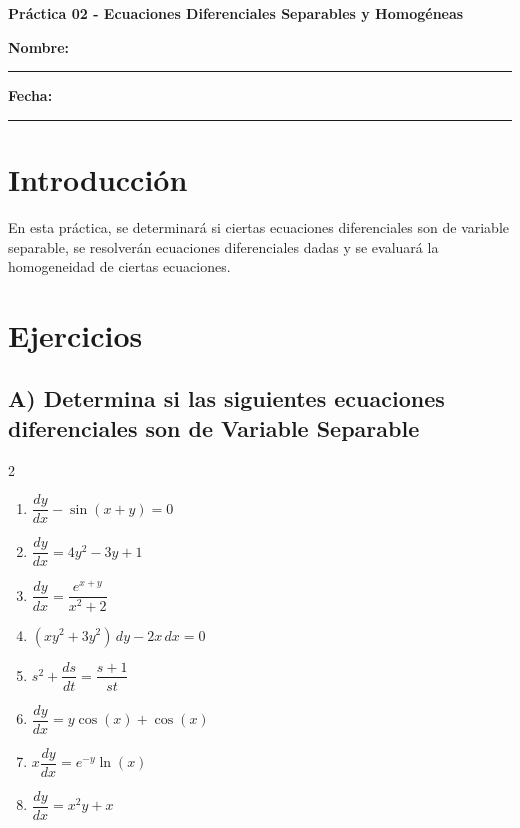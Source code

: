 \documentclass[a4paper,12pt]{article}
\begin{document}
\begin{center}
    \Large\textbf{Práctica 02 - Ecuaciones Diferenciales Separables y Homogéneas}\\[1cm]  

\end{center}
  \textbf{Nombre:} \rule{9cm}{0.4pt}  \textbf{Fecha:} \rule{4.5cm}{0.4pt}
\section*{Introducción}
\large
En esta práctica, se determinará si ciertas ecuaciones diferenciales son de variable separable, se resolverán ecuaciones diferenciales dadas y se evaluará la homogeneidad de ciertas ecuaciones.

\section*{Ejercicios}
\large

\subsection*{A) Determina si las siguientes ecuaciones diferenciales son de Variable Separable}
\begin{multicols}{2}
\begin{enumerate}
    \item $\dfrac{dy}{dx} - \sin(x + y) = 0$
    \item $\dfrac{dy}{dx} = 4y^2 - 3y + 1$
    \item $\dfrac{dy}{dx} = \dfrac{e^{x + y}}{x^2 + 2}$
    \item $(xy^2 + 3y^2) \, dy - 2x \, dx = 0$
    \item $s^2 + \dfrac{ds}{dt} = \dfrac{s + 1}{st}$
    \item $\dfrac{dy}{dx} = y \cos(x) + \cos(x)$
    \item $x \dfrac{dy}{dx} = e^{-y} \ln(x)$
    \item $\dfrac{dy}{dx} = x^2 y + x$
\end{enumerate}
\end{multicols}
\end{document}
